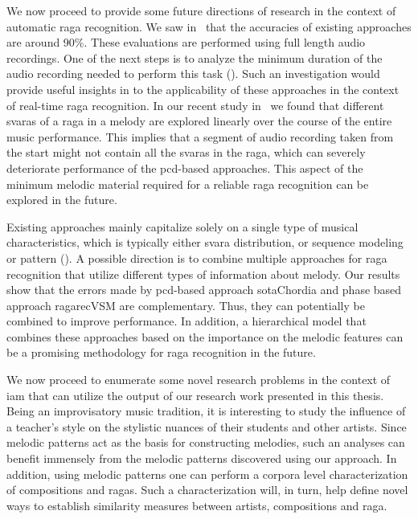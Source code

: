 We now proceed to provide some future directions of research in the context of automatic \gls{raga} recognition. We saw in~ that the accuracies of existing approaches are around 90\%. These evaluations are performed using full length audio recordings. One of the next steps is to analyze the minimum duration of the audio recording needed to perform this task (\cite{balkwill1999cross}). Such an investigation would provide useful insights in to the applicability of these approaches in the context of real-time \gls{raga} recognition. In our recent study in~\cite{kaustuv_ismir_2016} we found that different \glspl{svara} of a \gls{raga} in a melody are explored linearly over the course of the entire music performance. This implies that a segment of audio recording taken from the start might not contain all the \glspl{svara} in the \gls{raga}, which can severely deteriorate performance of the \gls{pcd}-based approaches. This aspect of the minimum melodic material required for a reliable \gls{raga} recognition can be explored in the future. 

Existing approaches mainly capitalize solely on a single type of musical characteristics, which is typically either svara distribution, or sequence modeling or pattern (). A possible direction is to combine multiple approaches for \gls{raga} recognition that utilize different types of information about melody. Our results show that the errors made by \gls{pcd}-based approach \acrshort{sotaChordia} and phase based approach \acrshort{ragarecVSM}  are complementary. Thus, they can potentially be combined to improve performance. In addition, a hierarchical model that combines these approaches based on the importance on the melodic features can be a promising methodology for \gls{raga} recognition in the future.

We now proceed to enumerate some novel research problems in the context of \gls{iam} that can utilize the output of our research work presented in this thesis. Being an improvisatory music tradition, it is interesting to study the influence of a teacher’s style on the stylistic nuances of their students and other artists. Since melodic patterns act as the  basis for constructing melodies, such an analyses can benefit immensely from the melodic patterns discovered using our approach. In addition, using melodic patterns one can perform a corpora level characterization of compositions and \glspl{raga}. Such a characterization will, in turn, help define novel ways to establish similarity measures between artists, compositions and \gls{raga}.

